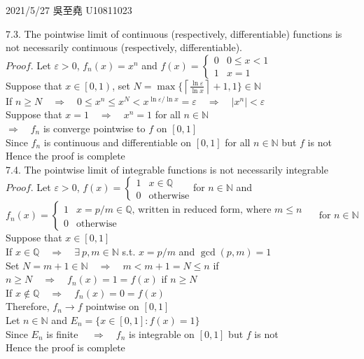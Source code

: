 \documentclass[12pt]{book}
\author{andersonwu2000}
\begin{document}
\begin{CJK}{UTF8}{bsmi}

\hfill 2021/5/27 吳至堯 U10811023

7.3. The pointwise limit of continuous (respectively, differentiable) functions is not necessarily continuous (respectively, differentiable). \\
$Proof$. Let $\varepsilon>0$, $f_n(x)=x^n$ and $\displaystyle f(x)=\left\{\begin{matrix}
  0 & 0\le x<1 \\
  1 & x=1
\end{matrix}\right.$ \\
Suppose that $x\in\left[0, 1\right)$, set $\displaystyle N=\max\{\left \lceil \frac{\ln{\varepsilon}}{\ln{x}} \right \rceil +1, 1\}\in\mathbb{N}$ \\
If $n\ge N\quad\Rightarrow\quad 0\le x^n\le x^N<x^{\ln{\varepsilon}/\ln{x}}=\varepsilon\quad\Rightarrow\quad|x^n|<\varepsilon$ \\
Suppose that $x=1\quad\Rightarrow\quad x^n=1$ for all $n\in\mathbb{N}$ \\
$\Rightarrow\quad f_n$ is converge pointwise to $f$ on $\left[0, 1\right]$ \\
Since $f_n$ is continuous and differentiable on $\left[0, 1\right]$ for all $n\in\mathbb{N}$ but $f$ is not \\
Hence the proof is complete \\

7.4. The pointwise limit of integrable functions is not necessarily integrable \\
$Proof$. Let $\varepsilon>0$, $\displaystyle f(x)=\left\{\begin{matrix}
  1 & x\in\mathbb{Q} \\
  0 & \text{otherwise}
\end{matrix}\right.$\quad for $n\in\mathbb{N}$ and \\
\[ f_n(x)=\left\{\begin{matrix}
  1 & x=p/m\in\mathbb{Q}\text{, written in reduced form, where }m\le n \\
  0 & \text{otherwise}
\end{matrix}\right.\quad\text{ for }n\in\mathbb{N}\]
Suppose that $x\in\left[0, 1\right]$ \\
If $x\in\mathbb{Q}\quad\Rightarrow\quad\exists\ p, m\in\mathbb{N}$ s.t. $x=p/m$ and $\gcd(p, m)=1$ \\
Set $N=m+1\in\mathbb{N}\quad\Rightarrow\quad m<m+1=N\le n$ if $n\ge N\quad\Rightarrow\quad f_n(x)=1=f(x)$ if $n\ge N$ \\
If $x\notin\mathbb{Q}\quad\Rightarrow\quad f_n(x)=0=f(x)$ \\
Therefore, $f_n\rightarrow f$ pointwise on $\left[0, 1\right]$ \\
Let $n\in\mathbb{N}$ and $E_n=\{x\in\left[0, 1\right]:f(x)=1\}$ \\
Since $E_n$ is finite $\quad\Rightarrow\quad f_n$ is integrable on $\left[0, 1\right]$ but $f$ is not  \\
Hence the proof is complete \\


\end{CJK}
\end{document}
